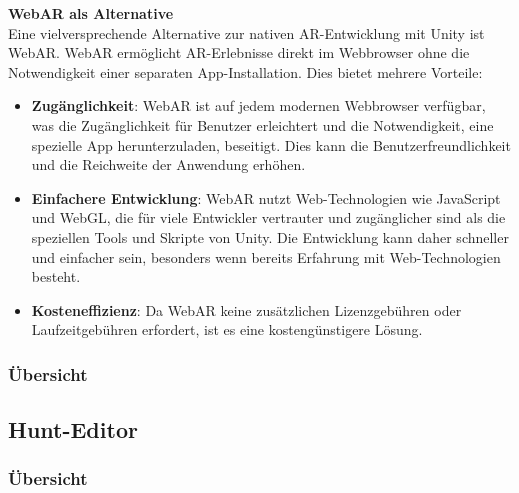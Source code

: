 \textbf{WebAR als Alternative}\\
Eine vielversprechende Alternative zur nativen AR-Entwicklung mit Unity ist WebAR. WebAR ermöglicht AR-Erlebnisse direkt im Webbrowser ohne die Notwendigkeit einer separaten App-Installation. Dies bietet mehrere Vorteile:
\begin{itemize}
    \item \textbf{Zugänglichkeit}: WebAR ist auf jedem modernen Webbrowser verfügbar, was die Zugänglichkeit für Benutzer erleichtert und die Notwendigkeit, eine spezielle App herunterzuladen, beseitigt. Dies kann die Benutzerfreundlichkeit und die Reichweite der Anwendung erhöhen.

    \item \textbf{Einfachere Entwicklung}: WebAR nutzt Web-Technologien wie JavaScript und WebGL, die für viele Entwickler vertrauter und zugänglicher sind als die speziellen Tools und Skripte von Unity. Die Entwicklung kann daher schneller und einfacher sein, besonders wenn bereits Erfahrung mit Web-Technologien besteht.

    \item \textbf{Kosteneffizienz}: Da WebAR keine zusätzlichen Lizenzgebühren oder Laufzeitgebühren erfordert, ist es eine kostengünstigere Lösung.

\end{itemize}

\subsubsection{Übersicht}


\subsection{Hunt-Editor}

\subsubsection{Übersicht}

